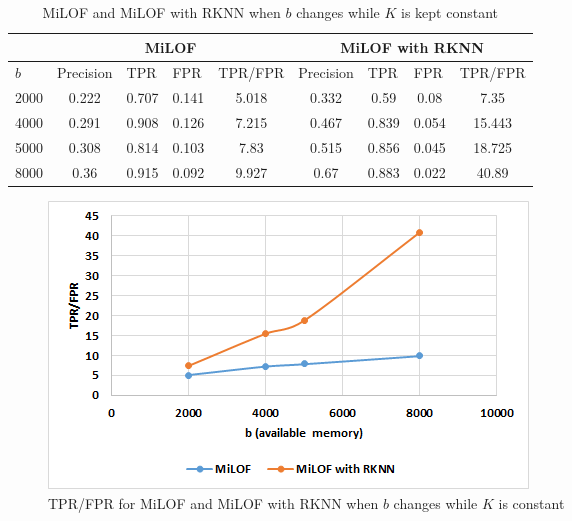 \begin{table}[H]
	\centering
	\caption{MiLOF and MiLOF with RKNN when $b$ changes while $K$ is kept constant}
	\label{my-label}
	\begin{tabular}{|l|c|c|c|c|c|c|c|c|}
		\hline
		& \multicolumn{4}{c|}{MiLOF}                                                                                                    & \multicolumn{4}{c|}{MiLOF with RKNN}                                                                                          \\ \hline
		$b$                          & \multicolumn{1}{l|}{Precision} & \multicolumn{1}{l|}{TPR} & \multicolumn{1}{l|}{FPR} & \multicolumn{1}{l|}{TPR/FPR} & \multicolumn{1}{l|}{Precision} & \multicolumn{1}{l|}{TPR} & \multicolumn{1}{l|}{FPR} & \multicolumn{1}{l|}{TPR/FPR} \\ \hline
		2000                       & 0.222                          & 0.707                              & 0.141                    & 5.018                        & 0.332                          & 0.59                               & 0.08                     & 7.35                         \\ \hline
		\multicolumn{1}{|c|}{4000} & 0.291                          & 0.908                              & 0.126                    & 7.215                        & 0.467                          & 0.839                              & 0.054                    & 15.443                       \\ \hline
		\multicolumn{1}{|c|}{5000} & 0.308                          & 0.814                              & 0.103                    & 7.83                         & 0.515                          & 0.856                              & 0.045                    & 18.725                       \\ \hline
		\multicolumn{1}{|c|}{8000} & 0.36                           & 0.915                              & 0.092                    & 9.927                        & 0.67                           & 0.883                              & 0.022                    & 40.89                        \\ \hline
	\end{tabular}
\end{table}


\begin{figure}[H]
	\centering
	\includegraphics{chap04/varyb.png}
	\caption{TPR/FPR for MiLOF and MiLOF with RKNN when $b$ changes while $K$ is constant}
\end{figure}


